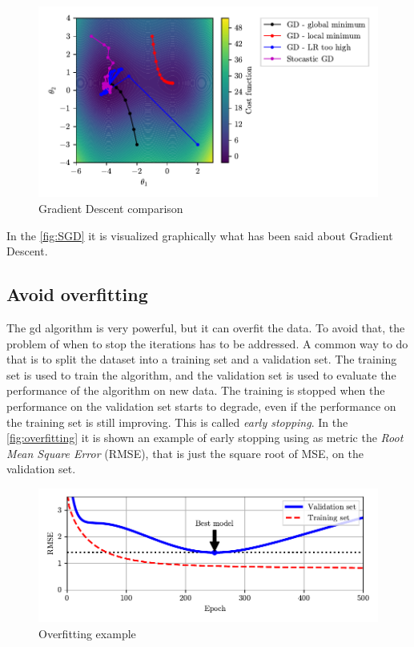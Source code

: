 \begin{figure}
    \centering
    \includegraphics[width=\textwidth]{images/MachineLearning/GradientDescent.pdf}
    \caption{Gradient Descent comparison}
    \label{fig:SGD}
\end{figure}

In the \autoref{fig:SGD} it is visualized graphically what has been said about Gradient Descent.

\subsection{Avoid overfitting}
\label{subsec:overfitting}
The \gls{gd} algorithm is very powerful, but it can overfit the data. To avoid that, the problem of when to stop the iterations has to be addressed. A common way to do that is to split the dataset into a training set and a validation set. The training set is used to train the algorithm, and the validation set is used to evaluate the performance of the algorithm on new data. The training is stopped when the performance on the validation set starts to degrade, even if the performance on the training set is still improving. This is called \emph{early stopping}. In the \autoref{fig:overfitting} it is shown an example of early stopping using as metric the \emph{Root Mean Square Error} (RMSE), that is just the square root of MSE, on the validation set.

\begin{figure}
    \centering
    \includegraphics[width=\textwidth]{images/MachineLearning/EarlyStopping.pdf}
    \caption{Overfitting example }
    \label{fig:overfitting}
\end{figure}

